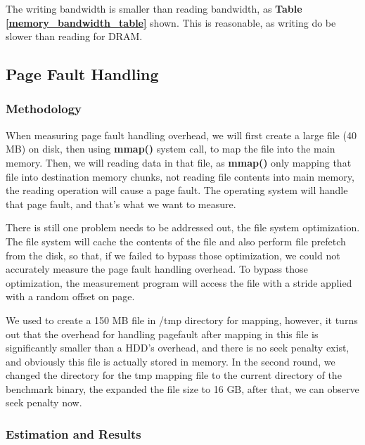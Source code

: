 The writing bandwidth is smaller than reading bandwidth, as \textbf{Table \ref{memory_bandwidth_table}} shown. This is reasonable, as writing do be slower than reading for DRAM.

\subsection{Page Fault Handling}

\subsubsection{Methodology}

When measuring page fault handling overhead, we will first create a large file (40 MB) on disk, then using \textbf{mmap()} system call, to map the file into the main memory. Then, we will reading data in that file, as \textbf{mmap()} only mapping that file into destination memory chunks, not reading file contents into main memory, the reading operation will cause a page fault. The operating system will handle that page fault, and that's what we want to measure.

There is still one problem needs to be addressed out, the file system optimization. The file system will cache the contents of the file and also perform file prefetch from the disk, so that, if we failed to bypass those optimization, we could not accurately measure the page fault handling overhead. To bypass those optimization, the measurement program will access the file with a stride applied with a random offset on page.

We used to create a 150 MB file in /tmp directory for mapping, however, it turns out that the overhead for handling pagefault after mapping in this file is significantly smaller than a HDD's overhead, and there is no seek penalty exist, and obviously this file is actually stored in memory. In the second round, we changed the directory for the tmp mapping file to the current directory of the benchmark binary, the expanded the file size to 16 GB, after that, we can observe seek penalty now.

\subsubsection{Estimation and Results}

